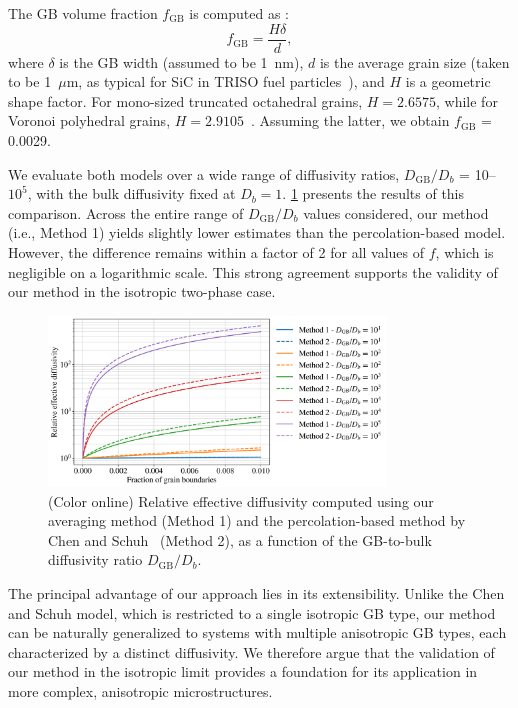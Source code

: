 \documentclass[%
preprint,
amsmath,amssymb,
aps,
]{revtex4-2}
\newcommand{\?}{\stackrel{?}{=}}
\begin{document}
The GB volume fraction $f_\text{GB}$ is computed as \cite{Chen2007}:
\begin{equation}
f_\text{GB} = \frac{H \delta}{d},
\end{equation}
where $\delta$ is the GB width (assumed to be 1~nm), $d$ is the average grain size (taken to be 1~$\mu$m, as typical for SiC in TRISO fuel particles~\cite{Lopez-Honorato2010,Rohbeck2016}), and $H$ is a geometric shape factor. For mono-sized truncated octahedral grains, $H = 2.6575$, while for Voronoi polyhedral grains, $H = 2.9105$~\cite{Chen2007}. Assuming the latter, we obtain $f_\text{GB}$ = 0.0029.

We evaluate both models over a wide range of diffusivity ratios, $D_\text{GB}/D_b$ = 10--$10^5$, with the bulk diffusivity fixed at $D_b = 1$. \cref{Fig:DGB_Db} presents the results of this comparison. Across the entire range of $D_\text{GB}/D_b$ values considered, our method (i.e., Method 1) yields slightly lower estimates than the percolation-based model. However, the difference remains within a factor of 2 for all values of $f$, which is negligible on a logarithmic scale. This strong agreement supports the validity of our method in the isotropic two-phase case.

\begin{figure}[h!]
 \centering
 \includegraphics[width=0.8\textwidth]{DGB_Db.png}
 \caption{(Color online) Relative effective diffusivity computed using our averaging method (Method 1) and the percolation-based method by Chen and Schuh~\cite{Chen2007} (Method 2), as a function of the GB-to-bulk diffusivity ratio $D_\text{GB}/D_b$.}
 \label{Fig:DGB_Db}
\end{figure}

The principal advantage of our approach lies in its extensibility. Unlike the Chen and Schuh model, which is restricted to a single isotropic GB type, our method can be naturally generalized to systems with multiple anisotropic GB types, each characterized by a distinct diffusivity. We therefore argue that the validation of our method in the isotropic limit provides a foundation for its application in more complex, anisotropic microstructures.
\end{document}
